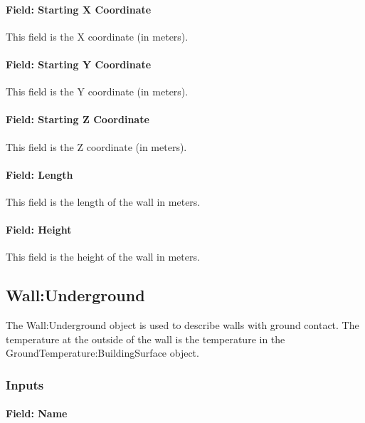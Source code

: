 \paragraph{Field: Starting X Coordinate}\label{field-starting-x-coordinate-1}

This field is the X coordinate (in meters).

\paragraph{Field: Starting Y Coordinate}\label{field-starting-y-coordinate-1}

This field is the Y coordinate (in meters).

\paragraph{Field: Starting Z Coordinate}\label{field-starting-z-coordinate-1}

This field is the Z coordinate (in meters).

\paragraph{Field: Length}\label{field-length-1}

This field is the length of the wall in meters.

\paragraph{Field: Height}\label{field-height-1}

This field is the height of the wall in meters.

\subsection{Wall:Underground}\label{wallunderground}

The Wall:Underground object is used to describe walls with ground contact. The temperature at the outside of the wall is the temperature in the GroundTemperature:BuildingSurface object.

\subsubsection{Inputs}\label{inputs-6-029}

\paragraph{Field: Name}\label{field-name-2-039}

